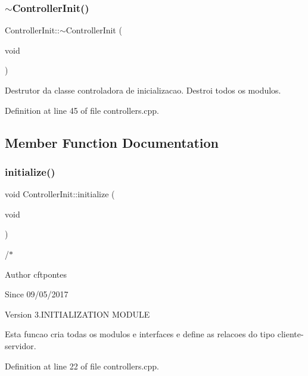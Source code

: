 \subsubsection{\texorpdfstring{$\sim$\+Controller\+Init()}{~ControllerInit()}}
{\footnotesize\ttfamily Controller\+Init\+::$\sim$\+Controller\+Init (\begin{DoxyParamCaption}\item[{void}]{ }\end{DoxyParamCaption})}

Destrutor da classe controladora de inicializacao. Destroi todos os modulos. 

Definition at line 45 of file controllers.\+cpp.



\subsection{Member Function Documentation}
\mbox{\label{class_controller_init_afd943d8b12a0d2ed5b2df171aaedb378}} 
\subsubsection{\texorpdfstring{initialize()}{initialize()}}
{\footnotesize\ttfamily void Controller\+Init\+::initialize (\begin{DoxyParamCaption}\item[{void}]{ }\end{DoxyParamCaption})}



/$\ast$ 

\begin{DoxyAuthor}{Author}
cftpontes 
\end{DoxyAuthor}
\begin{DoxySince}{Since}
09/05/2017 
\end{DoxySince}
\begin{DoxyVersion}{Version}
3.\+I\+N\+I\+T\+I\+A\+L\+I\+Z\+A\+T\+I\+ON M\+O\+D\+U\+LE 
\end{DoxyVersion}
Esta funcao cria todas os modulos e interfaces e define as relacoes do tipo cliente-\/servidor. 

Definition at line 22 of file controllers.\+cpp.

\mbox{\label{class_controller_init_a7a496045ee93029b095e84ce55e1818f}} 
